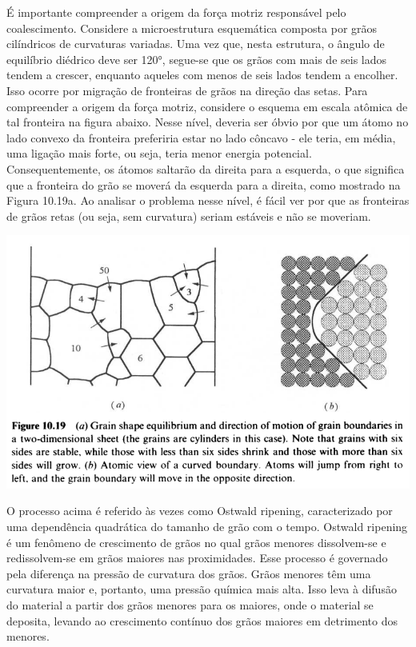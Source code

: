 É importante compreender a origem da força motriz responsável pelo coalescimento. Considere a microestrutura esquemática composta por grãos cilíndricos de curvaturas variadas. Uma vez que, nesta estrutura, o ângulo de equilíbrio diédrico deve ser 120°, segue-se que os grãos com mais de seis lados tendem a crescer, enquanto aqueles com menos de seis lados tendem a encolher. Isso ocorre por migração de fronteiras de grãos na direção das setas. Para compreender a origem da força motriz, considere o esquema em escala atômica de tal fronteira na figura abaixo. Nesse nível, deveria ser óbvio por que um átomo no lado convexo da fronteira preferiria estar no lado côncavo - ele teria, em média, uma ligação mais forte, ou seja, teria menor energia potencial. Consequentemente, os átomos saltarão da direita para a esquerda, o que significa que a fronteira do grão se moverá da esquerda para a direita, como mostrado na Figura 10.19a. Ao analisar o problema nesse nível, é fácil ver por que as fronteiras de grãos retas (ou seja, sem curvatura) seriam estáveis e não se moveriam.

\includegraphics*[width=\linewidth]{./images/equilibrio_graos_lados.png}

O processo acima é referido às vezes como Ostwald ripening, caracterizado por uma dependência quadrática do tamanho de grão com o tempo. Ostwald ripening é um fenômeno de crescimento de grãos no qual grãos menores dissolvem-se e redissolvem-se em grãos maiores nas proximidades. Esse processo é governado pela diferença na pressão de curvatura dos grãos. Grãos menores têm uma curvatura maior e, portanto, uma pressão química mais alta. Isso leva à difusão do material a partir dos grãos menores para os maiores, onde o material se deposita, levando ao crescimento contínuo dos grãos maiores em detrimento dos menores.

